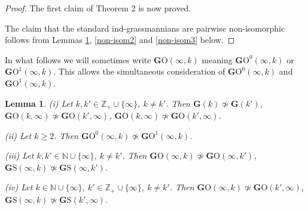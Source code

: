 \documentclass[12pt]{amsart}
\newtheorem{lemma}[theorem]{Lemma}
\theoremstyle{definition}
\begin{document}
\begin{proof}
The first claim of Theorem 2 is now proved.

The claim that the standard ind-grassmannians are pairwise non-isomorphic follows from Lemmas \ref{non-isom1},
\ref{non-isom2} and \ref{non-isom3} below.
\end{proof}

In what follows we will sometimes write $\mathbf{G}\mathrm{O}(\infty,k)$ meaning $\mathbf{G}\mathrm{O}^0(\infty,k)$
or $\mathbf{G}\mathrm{O}^1(\infty,k)$. This allows the simultaneous consideration of $\mathbf{G}\mathrm{O}^0(\infty,k)$
and $\mathbf{G}\mathrm{O}^1(\infty,k)$.

\begin{lemma}\label{non-isom1}
(i) Let $k,k'\in\mathbb{Z}_{+}\cup\{\infty\},\ k\ne k'$. Then
$\mathbf{G}(k)\not\simeq\mathbf{G}(k')$, $\mathbf{G}\mathrm{O}(k,\infty)\not\simeq\mathbf{G}\mathrm{O}(k',\infty)$,
$\mathbf{G}\mathrm{O}(k,\infty)\not\simeq\mathbf{G}\mathrm{O}(k',\infty)$.

(ii) Let $k\ge2$. Then $\mathbf{G}\mathrm{O}^0(\infty,k)\not\simeq\mathbf{G}\mathrm{O}^1(\infty,k)$.

(iii) Let $k,k'\in\mathbb{N}\cup\{\infty\},\ k\ne k'$. Then $\mathbf{G}\mathrm{O}(\infty,k)\not\simeq
\mathbf{G}\mathrm{O}(\infty,k')$, $\mathbf{G}\mathrm{S}(\infty,k)\not\simeq\mathbf{G}\mathrm{S}(\infty,k')$.

(iv) Let $k\in\mathbb{N}\cup\{\infty\},\ k'\in\mathbb{Z}_{+}\cup\{\infty\},\ k\ne k'$.
Then $\mathbf{G}\mathrm{O}(\infty,k)\not\simeq\mathbf{G}\mathrm{O}(k',\infty)$, $\mathbf{G}\mathrm{S}(\infty,k)
\not\simeq\mathbf{G}\mathrm{S}(k',\infty)$.

\end{lemma}
\end{document}
